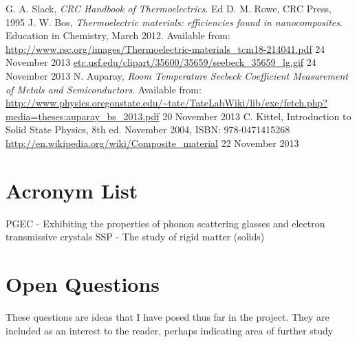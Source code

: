 \documentclass[a4paper,10pt,journal]{IEEEtran}
\begin{document}

\begin{thebibliography}{2}
G. A. Slack, \emph{CRC Handbook of Thermoelectrics}. Ed D. M. Rowe, CRC Press, 1995
J. W. Bos, \emph{Thermoelectric materials: efficiencies found in
nanocomposites}. Education in Chemistry, March 2012. Available
from:
\url{http://www.rsc.org/images/Thermoelectric-materials_tcm18-214041.pdf} 24 November 2013
\url{etc.usf.edu/clipart/35600/35659/seebeck_35659_lg.gif} 24 November
2013
N. Auparay, \emph{Room Temperature Seebeck Coefficient Measurement
of Metals and Semiconductors}. Available
from:
\url{http://www.physics.oregonstate.edu/~tate/TateLabWiki/lib/exe/fetch.php?media=theses:auparay_bs_2013.pdf} 20 November 2013
C. Kittel, Introduction to Solid State Physics, 8th ed. November 2004, ISBN: 978-0471415268
\url{http://en.wikipedia.org/wiki/Composite_material} 22 November 2013
\end{thebibliography}

\newpage
\appendix
\section{Acronym List}
\acresetall
\ac{PGEC} - Exhibiting the properties of phonon scattering glasses and
electron transmissive crystals
\ac{SSP} - The study of rigid matter (solids)

\section{Open Questions}
These questions are ideas that I have posed thus far in the project.
They are included as an interest to the reader, perhaps indicating
area of further study
\end{document}
